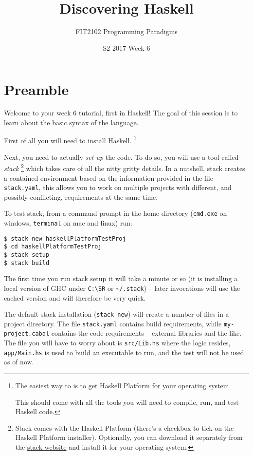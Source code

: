 \documentclass[12pt,]{tufte-handout}
\title{Discovering Haskell}
\author{FIT2102 Programming Paradigms}
\date{S2 2017 Week 6}
\begin{document}
\maketitle

\section{Preamble}\label{preamble}

Welcome to your week 6 tutorial, first in Haskell! The goal of this
session is to learn about the basic syntax of the language.

First of all you will need to install Haskell. \footnote{The easiest way
  to is to get \href{https://www.haskell.org/downloads}{Haskell
  Platform} for your operating system.

  This should come with all the tools you will need to compile, run, and
  test Haskell code.}

Next, you need to actually \emph{set up} the code. To do so, you will
use a tool called \emph{stack} \footnote{Stack comes with the Haskell
  Platform (there's a checkbox to tick on the Haskell Platform
  installer). Optionally, you can download it separately from the
  \href{https://docs.haskellstack.org/en/stable/README/}{stack website}
  and install it for your operating system.} which takes care of all the
nitty gritty details. In a nutshell, stack creates a contained
environment based on the information provided in the file
\texttt{stack.yaml}, this allows you to work on multiple projects with
different, and possibly conflicting, requirements at the same time.

To test stack, from a command prompt in the home directory
(\texttt{cmd.exe} on windows, \texttt{terminal} on mac and linux) run:

\begin{verbatim}
$ stack new haskellPlatformTestProj
$ cd haskellPlatformTestProj
$ stack setup
$ stack build
\end{verbatim}

The first time you run stack setup it will take a minute or so (it is
installing a local version of GHC under \texttt{C:\textbackslash{}SR} or
\texttt{\textasciitilde{}/.stack}) -- later invocations will use the
cached version and will therefore be very quick.

The default stack installation (\texttt{stack\ new}) will create a
number of files in a project directory. The file \texttt{stack.yaml}
contains build requirements, while \texttt{my-project.cabal} contains
the code requirements -- external libraries and the like. The file you
will have to worry about is \texttt{src/Lib.hs} where the logic resides,
\texttt{app/Main.hs} is used to build an executable to run, and the test
will not be used as of now.
\end{document}

